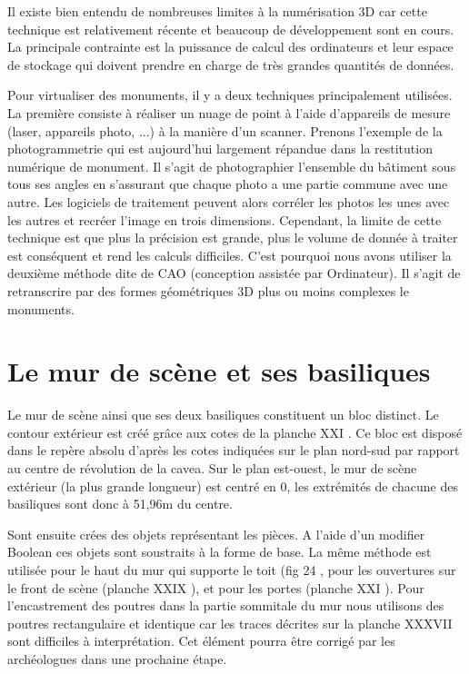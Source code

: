 Il existe bien entendu de nombreuses limites à la numérisation 3D car cette technique est relativement récente et beaucoup de développement sont en cours. La principale contrainte est la puissance de calcul des ordinateurs et leur espace de stockage qui doivent prendre en charge de très grandes quantités de données.

Pour virtualiser des monuments, il y a deux techniques principalement utilisées. La première consiste à réaliser un nuage de point à l'aide d'appareils de mesure (laser, appareils photo, ...) à la manière d'un scanner. Prenons l'exemple de la photogrammetrie qui est aujourd'hui largement répandue dans la restitution numérique de monument. Il s'agit de photographier l'ensemble du bâtiment sous tous ses angles en s'assurant que chaque photo a une partie commune avec une autre. Les logiciels de traitement peuvent alors corréler les photos les unes avec les autres et recréer l'image en trois dimensions. Cependant, la limite de cette technique est que plus la précision est grande, plus le volume de donnée à traiter est conséquent et rend les calculs difficiles. C'est pourquoi nous avons utiliser la deuxième méthode dite de CAO (conception assistée par Ordinateur). Il s'agit de retranscrire par des formes géométriques 3D plus ou moins complexes le monuments.


		\section{Le mur de scène et ses basiliques}

Le mur de scène ainsi que ses deux basiliques constituent un bloc distinct. Le contour extérieur est créé grâce aux cotes de la planche XXI \cite{ref2}. Ce bloc est disposé dans le repère absolu d'après les cotes indiquées sur le plan nord-sud par rapport au centre de révolution de la cavea. Sur le plan est-ouest, le mur de scène extérieur (la plus grande longueur) est centré en 0, les extrémités de chacune des basiliques sont donc à 51,96m du centre.

Sont ensuite crées des objets représentant les pièces. A l'aide d'un modifier Boolean ces objets sont soustraits à la forme de base. La même méthode est utilisée pour le haut du mur qui supporte le toit (fig 24 \cite{ref},  pour les ouvertures sur le front de scène (planche XXIX \cite{ref2}), et pour les portes (planche XXI \cite{ref2}). Pour l'encastrement des poutres dans la partie sommitale du mur nous utilisons des poutres rectangulaire et identique car les traces décrites sur la planche XXXVII \cite{ref2} sont difficiles à interprétation. Cet élément pourra être corrigé par les archéologues dans une prochaine étape.

